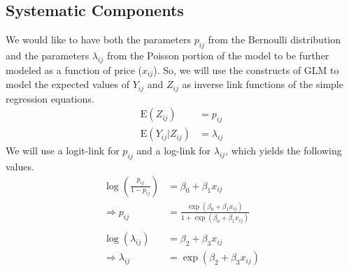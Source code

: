 \documentclass{article}\usepackage[]{graphicx}\usepackage[]{color}
\theoremstyle{plain}
\begin{document}
\subsection*{Systematic Components}
We would like to have both the parameters $p_{ij}$ from the Bernoulli distribution and the parameters $\lambda_{ij}$ from the Poisson portion of the model to be further modeled as a function of price ($x_{ij}$). So, we will use the constructs of GLM to model the expected values of $Y_{ij}$ and $Z_{ij}$ as inverse link functions of the simple regression equations.
\begin{align*}
\text{E}(Z_{ij}) &= p_{ij} \\
\text{E}(Y_{ij}|Z_{ij}) &= \lambda_{ij}
\end{align*}
We will use a logit-link for $p_{ij}$ and a log-link for $\lambda_{ij}$, which yields the following values.
\begin{align*}
\log\left( \frac{p_{ij}}{1-p_{ij}}\right) &= \beta_0 + \beta_1 x_{ij} \\ 
\Rightarrow p_{ij} &= \frac{\exp(\beta_0 + \beta_1 x_{ij})}{1 + \exp(\beta_0 + \beta_1 x_{ij})} \\
~\\
\log(\lambda_{ij}) &= \beta_2 + \beta_3 x_{ij} \\
\Rightarrow\lambda_{ij} &= \exp(\beta_2 + \beta_3 x_{ij}) \\
\end{align*}
\end{document}
